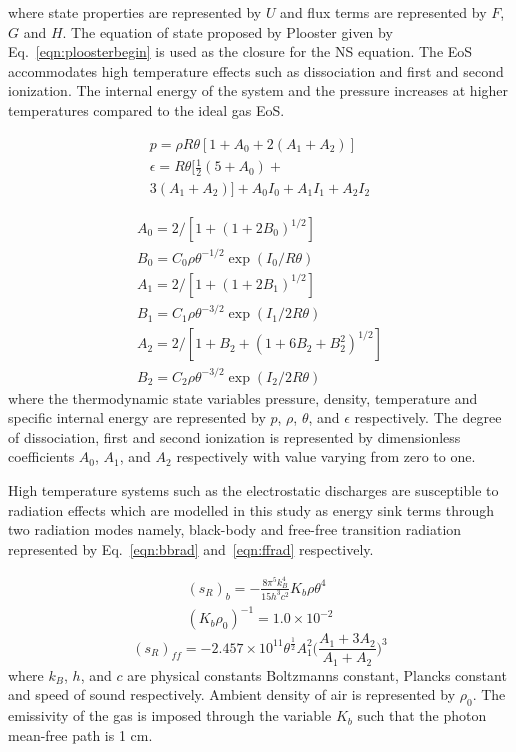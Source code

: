 \documentclass[12pt]{aiaa-tc}
\begin{document}
where state properties are represented by $U$ and flux terms are represented by $F$, $G$ and $H$.
The equation of state proposed by Plooster given by Eq.~\ref{eqn:ploosterbegin} is used as the closure for the NS equation. The EoS accommodates high temperature effects such as dissociation and first and second ionization. The internal energy of the system and the pressure increases at higher temperatures compared to the ideal gas EoS.

\begin{equation}
\begin{split}
    p = \rho R \theta [1+A_0+2(A_1+A_2)]\\
    \epsilon = R \theta [\frac{1}{2}(5+A_0)+\\ 
    3(A_1+A_2)]+A_0I_0+A_1I_1+A_2I_2 
\label{eqn:ploosterbegin}
\end{split}
\end{equation}


\begin{equation}
\begin{split}
    A_0 = 2/[1+(1+2B_0)^{1/2}]\\
    B_0 = C_0 \rho \theta^{-1/2}\exp(I_0/R\theta)\\
    A_1 = 2/[1+(1+2B_1)^{1/2}]\\
    B_1 = C_1 \rho \theta^{-3/2}\exp(I_1/2R\theta)\\
    A_2 = 2/[1+B_2+(1+6B_2+B_2^2)^{1/2}]\\
    B_2 = C_2 \rho  \theta^{-3/2}\exp(I_2/2R\theta)
\end{split}
\end{equation}
where the thermodynamic state variables pressure, density, temperature and specific internal energy are represented by $p$, $\rho$, $\theta$, and $\epsilon$ respectively. The degree of dissociation, first and second ionization is represented by dimensionless coefficients $A_0$, $A_1$, and $A_2$ respectively with value varying from zero to one.

High temperature systems such as the electrostatic discharges are susceptible to radiation effects which are modelled in this study as energy sink terms through two radiation modes namely, black-body and free-free transition radiation represented by Eq.~\ref{eqn:bbrad} and~\ref{eqn:ffrad} respectively.


\begin{equation}
  \begin{split}
   (s_R)_b=-\frac{8\pi^5k_B^4}{15h^3c^2} K_b\rho\theta^4\\
   (K_b\rho_0)^{-1} = 1.0\times10^{-2} 
  \end{split}
\label{eqn:bbrad}
\end{equation}
\begin{equation}
(s_R)_{ff} = -2.457\times10^{11}\theta^{\frac{1}{2}}A_1^2\bigg(\frac{A_1+3A_2}{A_1+A_2}\bigg)^3
\label{eqn:ffrad}
\end{equation}
where $k_B$, $h$, and $c$ are physical constants Boltzmanns constant, Plancks constant and speed of sound respectively. Ambient density of air is represented by $\rho_0$. The emissivity of the gas is imposed through the variable $K_b$ such that the photon mean-free path is 1 cm. 
\end{document}

